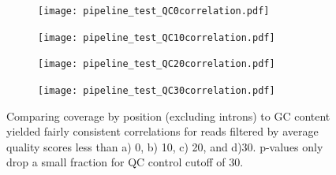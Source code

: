\documentclass[article]{revtex4}
\begin{document}
\graphicspath{{"./STAR_out/"}}
\begin{figure}
\begin{subfigure}{0.4\textwidth}
\texttt{[image: pipeline\_test\_QC0correlation.pdf]}
\caption{}
\end{subfigure}
\begin{subfigure}{0.4\textwidth}
\texttt{[image: pipeline\_test\_QC10correlation.pdf]}
\caption{}
\end{subfigure}
\begin{subfigure}{0.4\textwidth}
\texttt{[image: pipeline\_test\_QC20correlation.pdf]}
\caption{}
\end{subfigure}
\begin{subfigure}{0.4\textwidth}
\texttt{[image: pipeline\_test\_QC30correlation.pdf]}
\caption{}
\end{subfigure}
\caption{ Comparing coverage by position (excluding introns) to GC content yielded fairly consistent correlations for reads filtered by average quality scores less than a) 0, b) 10, c) 20, and d)30. p-values only drop a small fraction for QC control cutoff of 30.}\label{fig:GC_content}
\end{figure}



\end{document}
